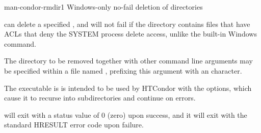 \begin{ManPage}{}{man-condor-rmdir}{1}
{Windows-only no-fail deletion of directories}

\Synopsis
{}



\Description 

 can delete a specified ,
and will not fail if the directory contains files that have ACLs 
that deny the SYSTEM process delete access,
unlike the built-in Windows  command. 

The directory to be removed together with other command line arguments
may be specified within a file named ,
prefixing this argument with an  character.

The  executable is is intended to be used  
by HTCondor with the    options, 
which cause it to recurse into subdirectories and continue on errors.

\begin{Options}










\end{Options}

\ExitStatus

 will exit with a status value of 0 (zero) upon success,
and it will exit with the standard HRESULT error code upon failure.

\end{ManPage}
